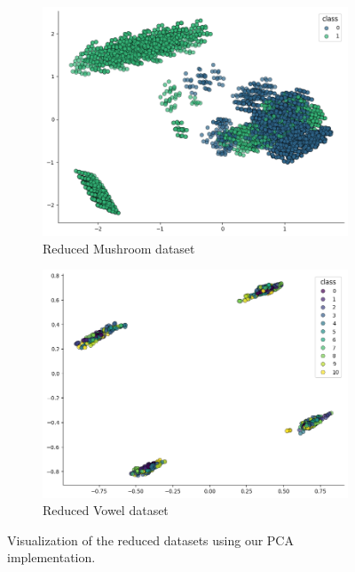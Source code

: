 \begin{figure}[h!]
    \centering
    \begin{subfigure}[b]{0.45\textwidth}
        \centering
        \includegraphics[width=\textwidth]{figures/mushroom_our_pca.png}
        \caption{Reduced Mushroom dataset}
        \label{our_pca_mushroom}
    \end{subfigure}
    \hfill
    \begin{subfigure}[b]{0.45\textwidth}
        \centering
        \includegraphics[width=\textwidth]{figures/vowel_our_pca.png}
        \caption{Reduced Vowel dataset}
        \label{our_pca_vowel}
    \end{subfigure}
    
    \caption{Visualization of the reduced datasets using our PCA implementation.}
    \label{fig:our_pca_datasets}
\end{figure}



